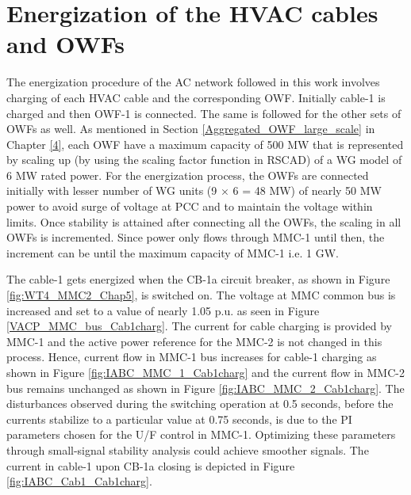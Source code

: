 \section{Energization of the HVAC cables and OWFs}\label{energization_HVAC_Cables}
The energization procedure of the \gls{AC} network followed in this work involves charging of each \gls{HVAC} cable and the corresponding \gls{OWF}. Initially cable-1 is charged and then \gls{OWF}-1 is connected. The same is followed for the other sets of \gls{OWF}s as well. As mentioned in Section \ref{Aggregated_OWF_large_scale} in Chapter \ref{4}, each \gls{OWF} have a maximum capacity of 500 MW that is represented by scaling up (by using the scaling factor function in RSCAD) of a \gls{WG} model of 6 MW rated power. For the energization process, the \gls{OWF}s are connected initially with lesser number of \gls{WG} units (9 $\times$ 6 = 48 MW) of nearly 50 MW power to avoid surge of voltage at \gls{PCC} and to maintain the voltage within limits. Once stability is attained after connecting all the \gls{OWF}s, the scaling in all \gls{OWF}s is incremented. Since power only flows through \gls{MMC}-1 until then, the increment can be until the maximum capacity of \gls{MMC}-1 i.e. 1 GW.

The cable-1 gets energized when the CB-1a circuit breaker, as shown in Figure \ref{fig:WT4_MMC2_Chap5}, is switched on. The voltage at \gls{MMC} common bus is increased and set to a value of nearly 1.05 p.u. as seen in Figure \ref{VACP_MMC_bus_Cab1charg}. The current for cable charging is provided by \gls{MMC}-1 and the active power reference for the \gls{MMC}-2 is not changed in this process. Hence, current flow in \gls{MMC}-1 bus increases for cable-1 charging as shown in Figure \ref{fig:IABC_MMC_1_Cab1charg} and the current flow in \gls{MMC}-2 bus remains unchanged as shown in Figure \ref{fig:IABC_MMC_2_Cab1charg}. The disturbances observed during the switching operation at 0.5 seconds, before the currents stabilize to a particular value at 0.75 seconds, is due to the \gls{PI} parameters chosen for the U/F control in \gls{MMC}-1. Optimizing these parameters through small-signal stability analysis could achieve smoother signals. The current in cable-1 upon CB-1a closing is depicted in Figure \ref{fig:IABC_Cab1_Cab1charg}. 


